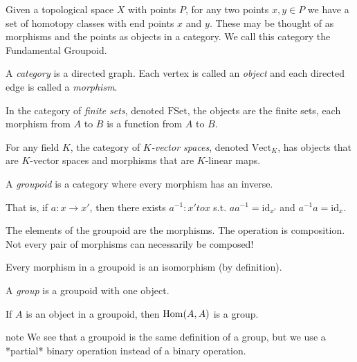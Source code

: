 \documentclass[11pt,leqno,oneside]{amsart}
\newenvironment{dateenv}{
  \vspace{1em}
}{
  \vspace{1em}
}
\newcommand{\mydate}[4]{
  \newdate{#1}{#2}{#3}{#4}
  \begin{dateenv}
    \hfill\displaydate{#1}
  \end{dateenv}
}
\numberwithin{thm}{section}
\newcommand{\id}{\text{id}}
\newcommand{\de}{\emph}
\begin{document}
Given a topological space \(X\) with points \(P\), for any two points
\(x,y \in P\) we have a set of homotopy classes with end points \(x\)
and \(y\). These may be thought of as morphisms and the points as
objects in a category. We call this category the Fundamental Groupoid.

\mydate{d2}{20}{1}{2017}

\begin{defn}
  A \de{category} is a directed graph.  Each vertex is called an
  \de{object} and each directed edge is called a \de{morphism}.
\end{defn}
\begin{defn}
  In the category of \de{finite sets}, denoted $\text{FSet}$, the
  objects are the finite sets, each morphism from $A$ to $B$ is a
  function from $A$ to $B$.
\end{defn}
\begin{defn}
  For any field $K$, the category of \de{$K$-vector spaces}, denoted
  $\text{Vect}_K$, has objects that are $K$-vector spaces and
  morphisms that are $K$-linear maps.
\end{defn}
\begin{defn}
  A \de{groupoid} is a category where every morphism has an inverse.

  That is, if $a: x \to x'$, then there exists $a^{-1}:x' to x$
  s.t. $aa^{-1} = \id_{x'}$ and $a^{-1}a = \id_{x}$.

  The elements of the groupoid are the morphisms.  The operation is
  composition.  Not every pair of morphisms can necessarily be composed!
\end{defn}
\begin{prop}
  Every morphism in a groupoid is an isomorphism (by definition).
\end{prop}
\begin{defn}
  A \de{group} is a groupoid with one object.
\end{defn}
\begin{prop}
  If $A$ is an object in a groupoid, then $\operatorname{Hom}(A, A)$ is a group.
\end{prop}

note We see that a groupoid is the same definition of a group, but we
use a *partial* binary operation instead of a binary operation.
\end{document}
